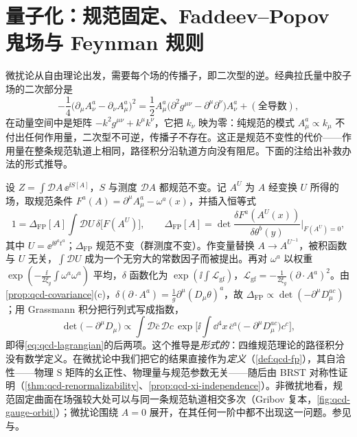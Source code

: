 \section{量子化：规范固定、Faddeev--Popov 鬼场与 Feynman 规则}\label{sec:qcd-quantization}

微扰论从自由理论出发，需要每个场的传播子，即二次型的逆。经典拉氏量中胶子场的二次部分是
\[
-\frac14\big(\partial_\mu A^a_\nu-\partial_\nu A^a_\mu\big)^2=\frac12A^a_\mu\big(\partial^2g^{\mu\nu}-\partial^\mu\partial^\nu\big)A^a_\nu+(\text{全导数}),
\]
在动量空间中是矩阵 $-k^2g^{\mu\nu}+k^\mu k^\nu$，它把 $k_\nu$ 映为零：纯规范的模式 $A^a_\mu\propto k_\mu$ 不付出任何作用量，二次型不可逆，传播子不存在。这正是规范不变性的代价——作用量在整条规范轨道上相同，路径积分沿轨道方向没有阻尼。下面的注给出补救办法的形式推导。

\begin{remark}\label{rem:qcd-fp-derivation}
设 $Z=\int\mathcal DA\,\ee^{\ii S[A]}$，$S$ 与测度 $\mathcal DA$ 都规范不变。记 $A^U$ 为 $A$ 经变换 $U$ 所得的场，取规范条件 $F^a(A)=\partial^\mu A^a_\mu-\omega^a(x)$，并插入恒等式
\[
1=\Delta_{\mathrm{FP}}[A]\int\mathcal DU\,\delta\big[F(A^U)\big],\qquad \Delta_{\mathrm{FP}}[A]=\det\frac{\delta F^a(A^U(x))}{\delta\theta^b(y)}\Big|_{F(A^U)=0},
\]
其中 $U=\ee^{\ii\theta^at^a}$；$\Delta_{\mathrm{FP}}$ 规范不变（群测度不变）。作变量替换 $A\to A^{U^{-1}}$，被积函数与 $U$ 无关，$\int\mathcal DU$ 成为一个无穷大的常数因子而被提出。再对 $\omega^a$ 以权重 $\exp(-\frac{\ii}{2\xi_g}\int\omega^a\omega^a)$ 平均，$\delta$ 函数化为 $\exp(\ii\int\mathcal L_{\mathrm{gf}})$，$\mathcal L_{\mathrm{gf}}=-\frac1{2\xi_g}(\partial\cdot A^a)^2$。由\cref{prop:qcd-covariance}(c)，$\delta(\partial\cdot A^a)=\frac1g\partial^\mu(D_\mu\theta)^a$，故 $\Delta_{\mathrm{FP}}\propto\det(-\partial^\mu D^{ac}_\mu)$；用 Grassmann 积分把行列式写成指数，
\[
\det\big(-\partial^\mu D_\mu\big)\propto\int\mathcal D\bar c\,\mathcal Dc\,\exp\Big[\ii\int\dd^4x\,\bar c^a\big(-\partial^\mu D^{ac}_\mu\big)c^c\Big],
\]
即得\cref{eq:qcd-lagrangian}的后两项\cite{Faddeev:1967fc}。这个推导是\emph{形式的}：四维规范理论的路径积分没有数学定义。在微扰论中我们把它的结果直接作为\emph{定义}（\cref{def:qcd-fp}），其自洽性——物理 S 矩阵的幺正性、物理量与规范参数无关——随后由 BRST 对称性证明（\cref{thm:qcd-renormalizability}、\cref{prop:qcd-xi-independence}）。非微扰地看，规范固定曲面在场强较大处可以与同一条规范轨道相交多次（Gribov 复本\cite{Gribov:1977wm}，\cref{fig:qcd-gauge-orbit}）；微扰论围绕 $A=0$ 展开，在其任何一阶中都不出现这一问题。参见\cite[第~16.2~节]{PeskinSchroeder1995}与\cite[第~15~章]{Weinberg1996}。
\end{remark}

